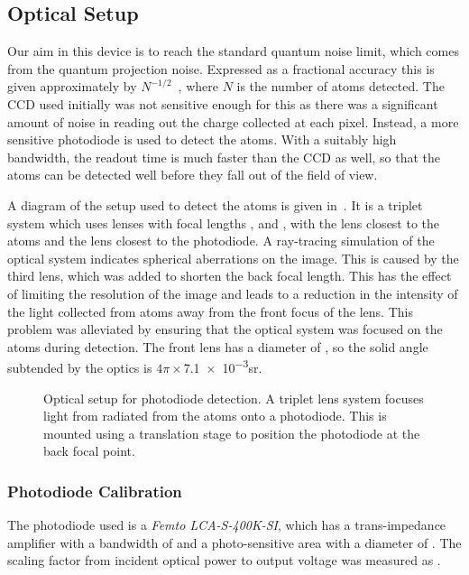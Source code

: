 \subsection{Optical Setup}\label{subsec:optical_setup}
Our aim in this device is to reach the standard quantum noise limit,
which comes from the quantum projection noise. Expressed as a
fractional accuracy this is given approximately by
$N^{-1/2}$~\cite{Bollinger1996}, where $N$ is the number of atoms detected.
The CCD used initially was not sensitive enough for this as there was a
significant amount of noise in reading out the charge collected at each pixel.
Instead, a more sensitive photodiode is used to detect the atoms. With a
suitably high bandwidth, the readout time is much faster than the CCD as well,
so that the atoms can be detected well before they fall out of the field of
view. \par\noindent A diagram of the setup used to detect the atoms is given
in~. It is a triplet system which uses
lenses with focal lengths ,
 and , with the
 lens closest to the atoms and the 
lens closest to the photodiode. A ray-tracing simulation of the optical
system indicates spherical aberrations on the image. This is caused by
the third lens, which was added to shorten the back focal length. This
has the effect of limiting the resolution of the image and leads to a
reduction in the intensity of the light collected from atoms away
from the front focus of the lens. This problem was alleviated by
ensuring that the optical system was focused on the atoms during
detection. The
front lens has a diameter of
, so the solid angle subtended by the
optics is \(4\pi \times\)\num{7.1e-3}\si{\steradian}.
\begin{figure}[!htbp] 
  \centering \fontsize{24pt}{24pt}
	\resizebox{0.7\textwidth}{!}{}
	\caption[Optical setup for Photodiode Detection]{Optical setup for photodiode
		detection. A triplet lens system focuses light from radiated from the atoms
		onto a photodiode. This is mounted using a translation stage to
  position the photodiode at the back focal point.}
  \label{fig:photodiode_optics}
\end{figure}

\subsubsection{Photodiode Calibration}
The photodiode used is a \textit{Femto LCA-S-400K-SI},
which has a trans-impedance amplifier with a bandwidth of  and a photo-sensitive area
with a diameter of . The scaling factor from
incident optical power to output voltage was measured as . 
